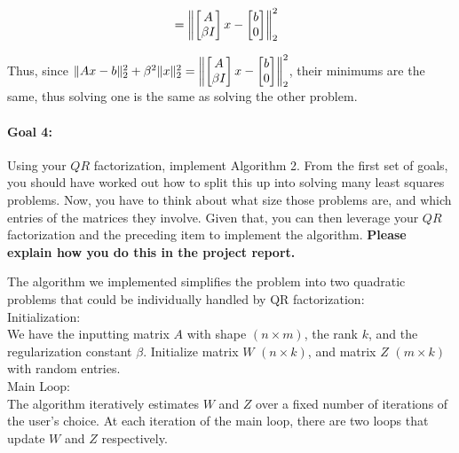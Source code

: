 \documentclass[11pt,onecolumn]{article}
\DeclarePairedDelimiter{\norm}{\lVert}{\rVert}
\newcommand{\bluebox}[1]{
  \begin{tcolorbox}[colback=blue!5!white,colframe=blue!75!black,boxrule=0.5pt,boxsep=0pt,left=6pt,right=16pt,top=4pt,bottom=4pt]
  #1
  \end{tcolorbox}   
}
\begin{document}
\begin{align*}
  \\ &=\norm*{\begin{bmatrix} A \\ \beta I\end{bmatrix}x - \begin{bmatrix}b \\ 0\end{bmatrix}}^2_2
\end{align*}

Thus, since $\norm{Ax-b}_2^2+\beta^2\norm x_2^2=\norm*{\begin{bmatrix} A \\ \beta I\end{bmatrix}x - \begin{bmatrix}b \\ 0\end{bmatrix}}^2_2$, their minimums are the same, thus solving one is the same as solving the other problem.

\newpage
\bluebox{
\paragraph{Goal 4:}
Using your $QR$ factorization, implement Algorithm 2. From the first set of goals, you should have worked out how to split this up into solving many least squares problems. Now, you have to think about what size those problems are, and which entries of the matrices they involve. Given that, you can then leverage your $QR$ factorization and the preceding item to implement the algorithm. \textbf{Please explain how you do this in the project report.}}

\noindent The algorithm we implemented simplifies the problem into two quadratic problems that could be individually handled by QR factorization: \\

\noindent
Initialization:\\
We have the inputting matrix $A$ with shape $(n \times m)$, the rank $k$, and the regularization constant $\beta$. Initialize matrix $W$ $(n \times k)$, and matrix $Z$ $(m \times k)$ with random entries.\\

\noindent
Main Loop:\\
The algorithm iteratively estimates $W$ and $Z$ over a fixed number of iterations of the user's choice. At each iteration of the main loop, there are two loops that update $W$ and $Z$ respectively.
\end{document}
